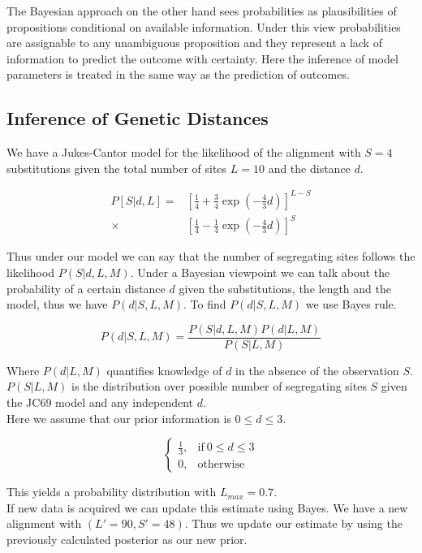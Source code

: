 \documentclass{article}
\begin{document}
\begin{multicols*}{3}
The Bayesian approach on the other hand sees probabilities as plausibilities of propositions conditional on available information. Under this view probabilities are assignable to any unambiguous proposition and they represent a lack of information to predict the outcome with certainty. Here the inference of model parameters is treated in the same way as the prediction of outcomes. 

\subsection{Inference of Genetic Distances}

We have a Jukes-Cantor model for the likelihood of the alignment with $S = 4$ substitutions given the total number of sites $L = 10$ and the distance $d$. 


\begin{align*}
P[S|d,L] =& \left[ \frac{1}{4} + \frac{3}{4}\exp \left(-\frac{4}{3}d\right)\right]^{L-S} \\ \times & \left[ \frac{1}{4} - \frac{1}{4}\exp \left(-\frac{4}{3}d\right)\right]^{S}
\end{align*}

Thus under our model we can say that the number of segregating sites follows the likelihood $P(S|d,L,M)$. Under a Bayesian viewpoint we can talk about the probability of a certain distance $d$ given the substitutions, the length and the model, thus we have $P(d|S,L,M)$. To find $P(d|S,L,M)$ we use Bayes rule. 

$$P(d|S,L,M) = \frac{P(S|d,L,M)P(d|L,M)}{P(S|L,M)}$$

Where $P(d|L,M)$ quantifies knowledge of $d$ in the absence of the observation $S$. $P(S|L,M)$ is the distribution over possible number of segregating sites $S$ given the JC69 model and any independent $d$.\\
Here we assume that our prior information is $0\leq d \leq 3$. 

$$    \begin{cases}
      \frac{1}{3}, & \text{if}\ 0\leq d \leq 3 \\
      0, & \text{otherwise}
    \end{cases}$$

This yields a probability distribution with $L_{max} = 0.7$.\\

If new data is acquired we can update this estimate using Bayes. We have a new alignment with $(L' = 90, S' = 48)$. Thus we update our estimate by using the previously calculated posterior as our new prior.\\


\end{multicols*}
\end{document}
